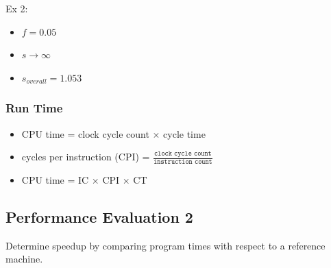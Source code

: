 \documentclass[12pt]{extarticle}
\begin{document}
	Ex 2:

	\begin{itemize}
		\item $f = 0.05$
		\item $s \rightarrow \infty$
		\item $s_{overall} = 1.053$
	\end{itemize}

	\subsubsection{Run Time}

	\begin{itemize}
		\item CPU time = clock cycle count $\times$ cycle time
		\item cycles per instruction (CPI) = $\frac{\texttt{clock cycle count}}{\texttt{instruction count}}$
		\item CPU time = IC $\times$ CPI $\times$ CT
	\end{itemize}

	\subsection{Performance Evaluation 2}

	Determine speedup by comparing program times with respect to a reference machine.

	
\end{document}
